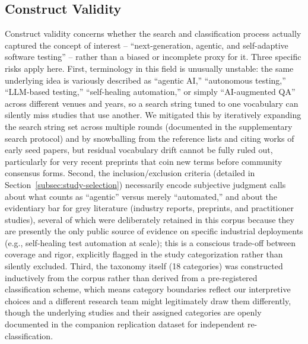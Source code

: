 %
\subsection{Construct Validity}
Construct validity concerns whether the search and classification
process actually captured the concept of interest -- ``next-generation,
agentic, and self-adaptive software testing'' -- rather than a biased
or incomplete proxy for it. Three specific risks apply here. First,
terminology in this field is unusually unstable: the same underlying
idea is variously described as ``agentic AI,'' ``autonomous testing,''
``LLM-based testing,'' ``self-healing automation,'' or simply
``AI-augmented QA'' across different venues and years, so a search
string tuned to one vocabulary can silently miss studies that use
another. We mitigated this by iteratively expanding the search string
set across multiple rounds (documented in the supplementary search protocol)
and by snowballing from the reference lists and citing works of early seed papers, but
residual vocabulary drift cannot be fully ruled out, particularly for
very recent preprints that coin new terms before community consensus
forms. Second, the inclusion/exclusion criteria (detailed in
Section~\ref{subsec:study-selection}) necessarily
encode subjective judgment calls about what counts as ``agentic''
versus merely ``automated,'' and about the evidentiary bar for grey
literature (industry reports, preprints, and
practitioner studies), several of which were deliberately retained in
this corpus because they are presently the only public source of
evidence on specific industrial deployments (e.g., self-healing test
automation at scale); this is a conscious trade-off between coverage
and rigor, explicitly flagged in the study categorization rather than silently
excluded. Third, the taxonomy itself (18 categories) was constructed
inductively from the corpus rather than derived from a pre-registered
classification scheme, which means category boundaries reflect our
interpretive choices and a different research team might legitimately
draw them differently, though the underlying studies and their
assigned categories are openly documented in the companion replication dataset
for independent re-classification.

